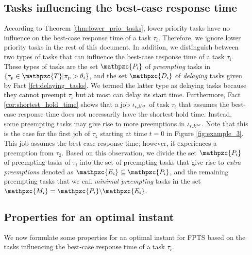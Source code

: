 \subsection{Tasks influencing the best-case response time}


According to Theorem \ref{thm:lower_prio_tasks}, lower priority tasks have no influence on the best-case response time of a task $\tau_i$. Therefore, we ignore lower priority tasks in the rest of this document. In addition, we distinguish between two types of tasks that can influence the {best-case response time} of a task $\tau_i$. These types of tasks are the set $\mathpzc{P_i}$ of \textit{preempting} tasks in $\{\tau_p \in \mathpzc{T} | \pi_p>\theta_i\}$, and the set $\mathpzc{D_i}$ of \textit{delaying} tasks given by Fact \ref{fct:delaying_tasks}. We termed the latter type as {delaying} tasks because they cannot preempt $\tau_i$ but at most can delay its start time. Furthermore, Fact \ref{cor:shortest_hold_time} shows that a job $\iota_{i,k^{\rm{br}}}$ of task $\tau_i$ that assumes the best-case response time does not necessarily have the shortest hold time. Instead, some preempting tasks may give rise to more preemptions in $\iota_{i,k^{\rm{br}}}$. Note that this is the case for the first job of $\tau_4$ starting at time $t=0$ in Figure \ref{fig:example_3}. This job assumes the best-case response time; however, it experiences a preemption from $\tau_2$. Based on this observation, we divide the set $\mathpzc{P_i}$ of preempting tasks of $\tau_i$  into the set of preempting tasks that give rise to \textit{extra preemptions} denoted as $\mathpzc{E_i} \subseteq \mathpzc{P_i}$, and the remaining preempting tasks that we call \textit{minimal preempting} tasks in the set $\mathpzc{M_i}=\mathpzc{P_i}\backslash\mathpzc{E_i}$.

\subsection{Properties for an optimal instant}

We now formulate some properties for an optimal instant for FPTS based on the tasks influencing the best-case response time of a task $\tau_i$.

